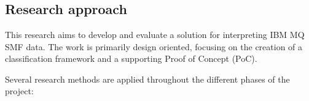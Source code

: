
\chapter{}%
\label{ch:methodologie}

\section{Research approach}

This research aims to develop and 
evaluate a solution for interpreting IBM MQ SMF data. 
The work is primarily design oriented, focusing on the creation of 
a classification framework and a supporting Proof of Concept (PoC).

Several research methods are applied throughout the different phases 
of the project:

